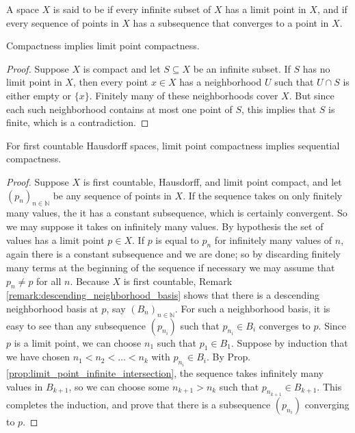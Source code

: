 \documentclass[11pt,a4paper]{article}
\begin{document}
\begin{mydef}
A space $X$ is said to be  if every infinite subset of $X$ has a limit point in $X$, and  if every sequence of points in $X$ has a subsequence that converges to a point in $X$.
\end{mydef}

\begin{prop}
Compactness implies limit point compactness.
\end{prop}

\begin{proof}
Suppose $X$ is compact and let $S\subseteq X$ be an infinite subset. If $S$ has no limit point in $X$, then every point $x\in X$ has a neighborhood $U$ such that $U\cap S$ is either empty or $\{x\}$. Finitely many of these neighborhoods cover $X$. But since each such neighborhood contains at most one point of $S$, this implies that $S$ is finite, which is a contradiction.
\end{proof}

\begin{prop}
For first countable Hausdorff spaces, limit point compactness implies sequential compactness.
\end{prop}

\begin{proof}
Suppose $X$ is first countable, Hausdorff, and limit point compact, and let $(p_n)_{n\in \mathbb{N}}$ be any sequence of points in $X$. If the sequence takes on only finitely many values, the it has a constant subsequence, which is certainly convergent. So we may suppose it takes on infinitely many values. By hypothesis the set of values has a limit point $p\in X$. If $p$ is equal to $p_n$ for infinitely many values of $n$, again there is a constant subsequence and we are done; so by discarding finitely many terms at the beginning of the sequence if necessary we may assume that $p_n\neq p$ for all $n$. Because $X$ is first countable, Remark \ref{remark:descending_neighborhood_basis} shows that there is a descending neighborhood basis at $p$, say $(B_n)_{n\in \mathbb{N}}$. For such a neighborhood basis, it is easy to see than any subsequence $(p_{n_i})$ such that $p_{n_i}\in B_i$ converges to $p$. Since $p$ is a limit point, we can choose $n_1$ such that $p_1\in B_1$. Suppose by induction that we have chosen $n_1<n_2<\ldots<n_k$ with $p_{n_i}\in B_i$. By Prop. \ref{prop:limit_point_infinite_intersection}, the sequence takes infinitely many values in $B_{k+1}$, so we can choose some $n_{k+1}>n_k$ such that $p_{n_{k+1}}\in B_{k+1}$. This completes the induction, and prove that there is a subsequence $(p_{n_i})$ converging to $p$.
\end{proof}
\end{document}
